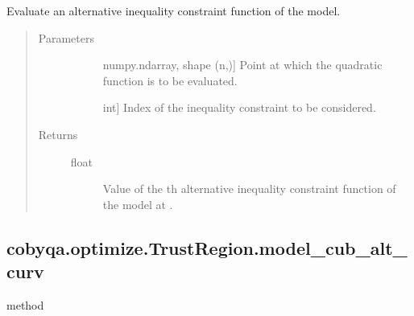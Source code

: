 \documentclass[letterpaper,10pt,english]{sphinxmanual}
\begin{document}
\begin{fulllineitems}
\begin{fulllineitems}
\label{\detokenize{refs/generated/cobyqa.optimize.TrustRegion.model_cub_alt:cobyqa.optimize.TrustRegion.model_cub_alt}}
\sphinxAtStartPar
Evaluate an alternative inequality constraint function of the model.
\begin{quote}\begin{description}
\item[{Parameters}] \leavevmode\begin{description}
\item[{}] \leavevmode{[}numpy.ndarray, shape (n,){]}
\sphinxAtStartPar
Point at which the quadratic function is to be evaluated.

\item[{}] \leavevmode{[}int{]}
\sphinxAtStartPar
Index of the inequality constraint to be considered.

\end{description}

\item[{Returns}] \leavevmode\begin{description}
\item[{float}] \leavevmode
\sphinxAtStartPar
Value of the \sphinxhyphen{}th alternative inequality constraint function of
the model at .

\end{description}

\end{description}\end{quote}

\end{fulllineitems}



\subsection{cobyqa.optimize.TrustRegion.model\_cub\_alt\_curv}
\label{\detokenize{refs/generated/cobyqa.optimize.TrustRegion.model_cub_alt_curv:cobyqa-optimize-trustregion-model-cub-alt-curv}}\label{\detokenize{refs/generated/cobyqa.optimize.TrustRegion.model_cub_alt_curv::doc}}
\sphinxAtStartPar
method


\end{fulllineitems}
\end{document}
